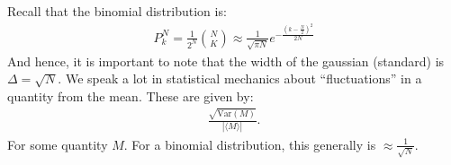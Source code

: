 \documentclass{article}
\begin{document}


 Recall that the binomial distribution is:
\begin{align*}
  P_k^N = \frac{1}{2^N} {N\choose{K}} \approx \frac{1}{\sqrt{\pi N}} e^{- \frac{\left(k- \frac{N}{2}\right)^2}{2N}}
\end{align*}
And hence, it is important to note that the width of the gaussian (standard) is $\Delta = \sqrt{N}$.
 We speak a lot in statistical mechanics about ``fluctuations'' in a quantity from the mean. These are given by:
\begin{align*}
  \frac{\sqrt{\text{Var}(M)}}{\left| \langle M \rangle \right|}.
\end{align*}
For some quantity $M$. For a binomial distribution, this generally is $\approx \frac{1}{\sqrt{N}}$.
\gap
{}
\end{document}
